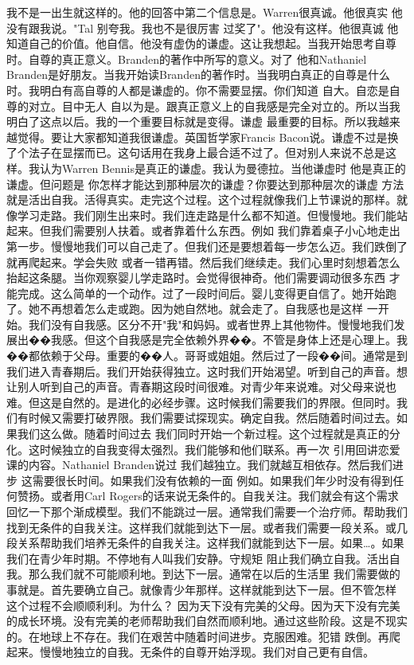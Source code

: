 我不是一出生就这样的。他的回答中第二个信息是。Warren很真诚。他很真实 他没有跟我说。"Tal 别夸我。我也不是很厉害 过奖了"。他没有这样。他很真诚 他知道自己的价值。他自信。他没有虚伪的谦虚。这让我想起。当我开始思考自尊时。自尊的真正意义。Branden的著作中所写的意义。对了 他和Nathaniel Branden是好朋友。当我开始读Branden的著作时。当我明白真正的自尊是什么时。我明白有高自尊的人都是谦虚的。你不需要显摆。你们知道 自大。自恋是自尊的对立。目中无人 自以为是。跟真正意义上的自我感是完全对立的。所以当我明白了这点以后。我的一个重要目标就是变得。谦虚 最重要的目标。所以我越来越觉得。要让大家都知道我很谦虚。英国哲学家Francis Bacon说。谦虚不过是换了个法子在显摆而已。这句话用在我身上最合适不过了。但对别人来说不总是这样。我认为Warren Bennis是真正的谦虚。我认为曼德拉。当他谦虚时 他是真正的谦虚。但问题是 你怎样才能达到那种层次的谦虚？你要达到那种层次的谦虚 方法就是活出自我。活得真实。走完这个过程。这个过程就像我们上节课说的那样。就像学习走路。我们刚生出来时。我们连走路是什么都不知道。但慢慢地。我们能站起来。但我们需要别人扶着。或者靠着什么东西。例如 我们靠着桌子小心地走出第一步。慢慢地我们可以自己走了。但我们还是要想着每一步怎么迈。我们跌倒了就再爬起来。学会失败 或者一错再错。然后我们继续走。我们心里时刻想着怎么抬起这条腿。当你观察婴儿学走路时。会觉得很神奇。他们需要调动很多东西 才能完成。这么简单的一个动作。过了一段时间后。婴儿变得更自信了。她开始跑了。她不再想着怎么走或跑。因为她自然地。就会走了。自我感也是这样 一开始。我们没有自我感。区分不开"我"和妈妈。或者世界上其他物件。慢慢地我们发展出��我感。但这个自我感是完全依赖外界��。不管是身体上还是心理上。我��都依赖于父母。重要的��人。哥哥或姐姐。然后过了一段��间。通常是到我们进入青春期后。我们开始获得独立。这时我们开始渴望。听到自己的声音。想让别人听到自己的声音。青春期这段时间很难。对青少年来说难。对父母来说也难。但这是自然的。是进化的必经步骤。这时候我们需要我们的界限。但同时。我们有时候又需要打破界限。我们需要试探现实。确定自我。然后随着时间过去。如果我们这么做。随着时间过去 我们同时开始一个新过程。这个过程就是真正的分化。这时候独立的自我变得太强烈。我们能够和他们联系。再一次 引用回讲恋爱课的内容。Nathaniel Branden说过 我们越独立。我们就越互相依存。然后我们进步 这需要很长时间。如果我们没有依赖的一面 例如。如果我们年少时没有得到任何赞扬。或者用Carl Rogers的话来说无条件的。自我关注。我们就会有这个需求 回忆一下那个渐成模型。我们不能跳过一层。通常我们需要一个治疗师。帮助我们找到无条件的自我关注。这样我们就能到达下一层。或者我们需要一段关系。或几段关系帮助我们培养无条件的自我关注。这样我们就能到达下一层。如果…。如果我们在青少年时期。不停地有人叫我们安静。守规矩 阻止我们确立自我。活出自我。那么我们就不可能顺利地。到达下一层。通常在以后的生活里 我们需要做的事就是。首先要确立自己。就像青少年那样。这样就能到达下一层。但不管怎样 这个过程不会顺顺利利。为什么？ 因为天下没有完美的父母。因为天下没有完美的成长环境。没有完美的老师帮助我们自然而顺利地。通过这些阶段。这是不现实的。在地球上不存在。我们在艰苦中随着时间进步。克服困难。犯错 跌倒。再爬起来。慢慢地独立的自我。无条件的自尊开始浮现。我们对自己更有自信。 

